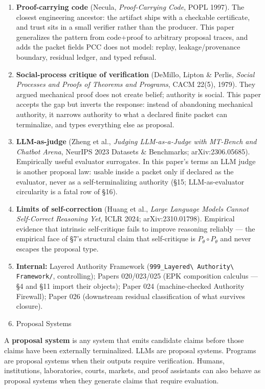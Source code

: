 \documentclass[
  10pt,
]{article}
\DeclareRobustCommand{\texttt}[1]{{\paperSymbolFont\nolinkurl{#1}}}
\begin{document}
\begin{enumerate}
\def\labelenumi{\arabic{enumi}.}
\item
  \textbf{Proof-carrying code} (Necula, \emph{Proof-Carrying Code}, POPL 1997). The closest engineering ancestor: the artifact ships with a checkable certificate, and trust sits in a small verifier rather than the producer. This paper generalizes the pattern from code+proof to arbitrary proposal traces, and adds the packet fields PCC does not model: replay, leakage/provenance boundary, residual ledger, and typed refusal.
\item
  \textbf{Social-process critique of verification} (DeMillo, Lipton \& Perlis, \emph{Social Processes and Proofs of Theorems and Programs}, CACM 22(5), 1979). They argued mechanical proof does not create belief; authority is social. This paper accepts the gap but inverts the response: instead of abandoning mechanical authority, it narrows authority to what a declared finite packet can terminalize, and types everything else as proposal.
\item
  \textbf{LLM-as-judge} (Zheng et al., \emph{Judging LLM-as-a-Judge with MT-Bench and Chatbot Arena}, NeurIPS 2023 Datasets \& Benchmarks; arXiv:2306.05685). Empirically useful evaluator surrogates. In this paper's terms an LLM judge is another proposal law: usable inside a packet only if declared as the evaluator, never as a self-terminalizing authority (§15; LLM-as-evaluator circularity is a fatal row of §16).
\item
  \textbf{Limits of self-correction} (Huang et al., \emph{Large Language Models Cannot Self-Correct Reasoning Yet}, ICLR 2024; arXiv:2310.01798). Empirical evidence that intrinsic self-critique fails to improve reasoning reliably --- the empirical face of §7's structural claim that self-critique is \protect\hypertarget{math-E0016-0022}{}{\(P_\theta \circ P_\theta\)} and never escapes the proposal type.
\item
  \textbf{Internal:} Layered Authority Framework (\texttt{999\_Layered\ Authority\ Framework/}, controlling); Papers 020/023/025 (EPK composition calculus --- §4 and §11 import their objects); Paper 024 (machine-checked Authority Firewall); Paper 026 (downstream residual classification of what survives closure).
\item
  Proposal Systems
\end{enumerate}

A \textbf{proposal system} is any system that emits candidate claims before those claims have been externally terminalized. LLMs are proposal systems. Programs are proposal systems when their outputs require verification. Humans, institutions, laboratories, courts, markets, and proof assistants can also behave as proposal systems when they generate claims that require evaluation.
\end{document}
